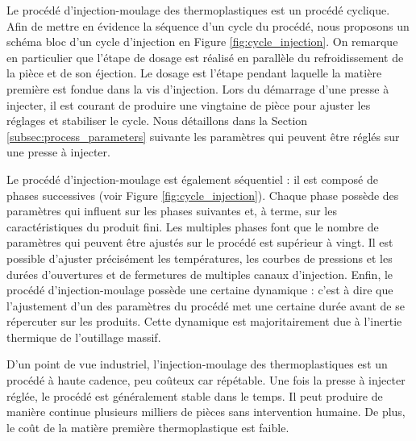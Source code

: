 Le procédé d'injection-moulage des thermoplastiques est un procédé cyclique.
Afin de mettre en évidence la séquence d’un cycle du procédé, nous proposons un schéma bloc d’un cycle d’injection en Figure \ref{fig:cycle_injection}.
On remarque en particulier que l'étape de dosage est réalisé en parallèle du refroidissement de la pièce et de son éjection.
Le dosage est l'étape pendant laquelle la matière première est fondue dans la vis d'injection.
Lors du démarrage d'une presse à injecter, il est courant de produire une vingtaine de pièce pour ajuster les réglages et stabiliser le cycle.
Nous détaillons dans la Section \ref{subsec:process_parameters} suivante les paramètres qui peuvent être réglés sur une presse à injecter.

Le procédé d'injection-moulage est également séquentiel : il est composé de phases successives (voir Figure \ref{fig:cycle_injection}).
Chaque phase possède des paramètres qui influent sur les phases suivantes et, à terme, sur les caractéristiques du produit fini.
Les multiples phases font que le nombre de paramètres qui peuvent être ajustés sur le procédé est supérieur à vingt.
Il est possible d’ajuster précisément les températures, les courbes de pressions et les durées d’ouvertures et de fermetures de multiples canaux d’injection.  %
Enfin, le procédé d'injection-moulage possède une certaine dynamique : c'est à dire que l'ajustement d'un des paramètres du procédé met une certaine durée avant de se répercuter sur les produits.
Cette dynamique est majoritairement due à l'inertie thermique de l'outillage massif.



D'un point de vue industriel, l’injection-moulage des thermoplastiques est un procédé à haute cadence, peu coûteux car répétable.
Une fois la presse à injecter réglée, le procédé est généralement stable dans le temps.
Il peut produire de manière continue plusieurs milliers de pièces sans intervention humaine.
De plus, le coût de la matière première thermoplastique est faible.

